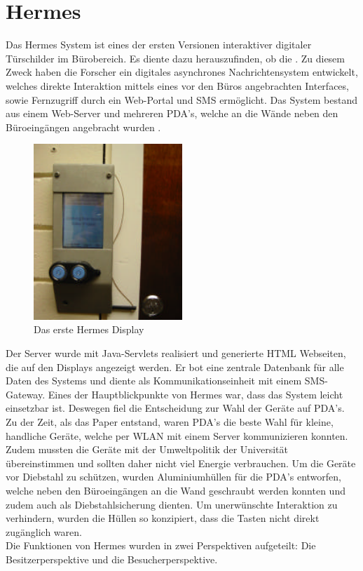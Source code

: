 \section{Hermes}
Das Hermes System\cite{cheverest:2003:paper,cheverest:2003:article,cheveres:2005:hermes-bluetooth} ist eines der ersten Versionen interaktiver digitaler Türschilder im Bürobereich.
Es diente dazu herauszufinden, ob die .
Zu diesem Zweck haben die Forscher ein digitales asynchrones Nachrichtensystem entwickelt, welches direkte Interaktion mittels eines vor den Büros angebrachten Interfaces, sowie Fernzugriff durch ein Web-Portal und SMS ermöglicht.
Das System bestand aus einem Web-Server und mehreren PDA's, welche an die Wände neben den Büroeingängen angebracht wurden .
\begin{figure}[h!]
  \centering
  \includegraphics[width=0.5\textwidth]{./img/hermes_display.png}
  \caption{Das erste Hermes Display\cite{cheverest:2003:paper}}
  \label{img:hermesDisplay}
\end{figure}
Der Server wurde mit Java-Servlets realisiert und generierte HTML Webseiten, die auf den Displays angezeigt werden. Er bot eine zentrale Datenbank für alle Daten des Systems und diente als Kommunikationseinheit mit einem SMS-Gateway.
Eines der Hauptblickpunkte von Hermes war, dass das System leicht einsetzbar ist. Deswegen fiel die Entscheidung zur Wahl der Geräte auf PDA's. Zu der Zeit, als das Paper entstand, waren PDA's die beste Wahl für kleine, handliche Geräte, welche per WLAN mit einem Server kommunizieren konnten. Zudem mussten die Geräte mit der Umweltpolitik der Universität übereinstimmen und sollten daher nicht viel Energie verbrauchen.
Um die Geräte vor Diebstahl zu schützen, wurden Aluminiumhüllen für die PDA's entworfen, welche neben den Büroeingängen an die Wand geschraubt werden konnten und zudem auch als Diebstahlsicherung dienten. Um unerwünschte Interaktion zu verhindern, wurden die Hüllen so konzipiert, dass die Tasten nicht direkt zugänglich waren.
\\
Die Funktionen von Hermes wurden in zwei Perspektiven aufgeteilt: Die Besitzerperspektive und die Besucherperspektive.
